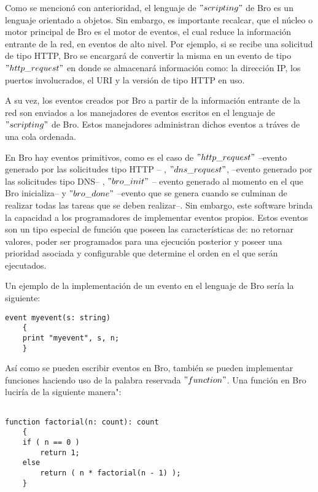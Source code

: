 Como se mencionó con anterioridad, el lenguaje de $"scripting"$ de Bro es un lenguaje orientado a objetos. Sin embargo, es importante recalcar, que el núcleo o motor principal de Bro es el motor de eventos, el cual reduce la información entrante de la red, en eventos de alto nivel. Por ejemplo, si se recibe una solicitud de tipo HTTP, Bro se encargará de convertir la misma en un evento de tipo $"http\_request"$ en donde se almacenará información como: la dirección IP, los puertos involucrados, el URI y la versión de tipo HTTP en uso.

A su vez, los eventos creados por Bro a partir de la información entrante de la red son enviados a los manejadores de eventos escritos en el lenguaje de $"scripting"$ de Bro. Estos manejadores administran dichos eventos a tráves de una cola ordenada.

En Bro hay eventos primitivos, como es el caso de $"http\_request"$ --evento generado por las solicitudes tipo HTTP -- , $"dns\_request"$, --evento generado por las solicitudes tipo DNS-- , $"bro\_init"$ -- evento generado al momento en el que Bro inicializa-- y $"bro\_done"$ --evento que se genera cuando se culminan de realizar todas las tareas que se deben realizar--. Sin embargo, este software brinda la capacidad a los programadores de implementar eventos propios. Estos eventos son un tipo especial de función que poseen las características de: no retornar valores, poder ser programados para una ejecución posterior y poseer una prioridad asociada y configurable que determine el orden en el que serán ejecutados.

Un ejemplo de la implementación de un evento en el lenguaje de Bro sería la siguiente:

\begin{verbatim}
event myevent(s: string)
	{
	print "myevent", s, n;
	}
\end{verbatim}

Así como se pueden escribir eventos en Bro, también se pueden implementar funciones haciendo uso de la palabra reservada $"function"$. Una función en Bro luciría de la siguiente manera":

\begin{verbatim}

function factorial(n: count): count
    {
    if ( n == 0 )
        return 1;
    else
        return ( n * factorial(n - 1) );
    }

\end{verbatim}

